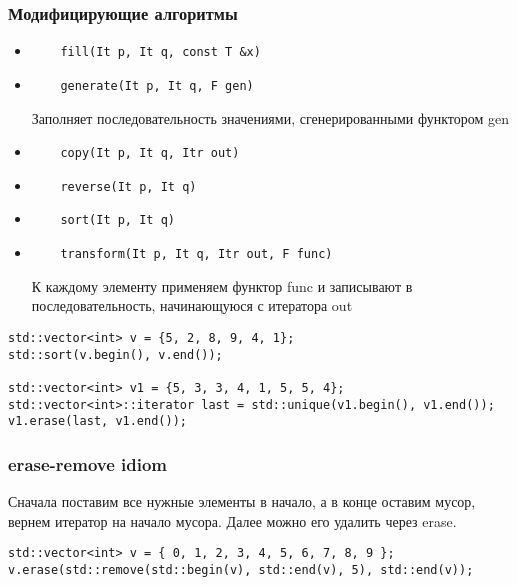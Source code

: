 \subsubsection{Модифицирующие алгоритмы}
\begin{itemize}[noitemsep]
\item 
	\begin{verbatim}
	fill(It p, It q, const T &x)
	\end{verbatim} 
\item 
	\begin{verbatim}
	generate(It p, It q, F gen)
	\end{verbatim} 
	Заполняет последовательность значениями, сгенерированными функтором gen
\item 
	\begin{verbatim}
	copy(It p, It q, Itr out)
	\end{verbatim} 
\item 
	\begin{verbatim}
	reverse(It p, It q)
	\end{verbatim} 
\item 
	\begin{verbatim}
	sort(It p, It q)
	\end{verbatim} 
\item 
	\begin{verbatim}
	transform(It p, It q, Itr out, F func)
	\end{verbatim} 
	К каждому элементу применяем функтор func и записывают в последовательность, начинающуюся с итератора out
\end{itemize}
\begin{verbatim}
std::vector<int> v = {5, 2, 8, 9, 4, 1};
std::sort(v.begin(), v.end());

std::vector<int> v1 = {5, 3, 3, 4, 1, 5, 5, 4};
std::vector<int>::iterator last = std::unique(v1.begin(), v1.end());
v1.erase(last, v1.end());
\end{verbatim}

\subsubsection{erase-remove idiom}
Сначала поставим все нужные элементы в начало, а в конце оставим мусор, вернем итератор на начало мусора. Далее можно его удалить через erase. 
\begin{verbatim}
std::vector<int> v = { 0, 1, 2, 3, 4, 5, 6, 7, 8, 9 };
v.erase(std::remove(std::begin(v), std::end(v), 5), std::end(v)); 
\end{verbatim}

